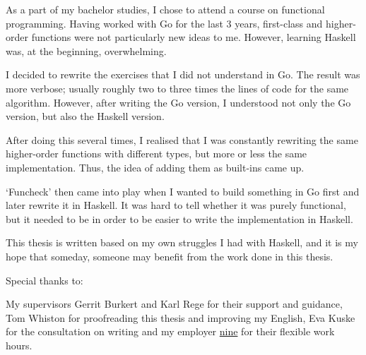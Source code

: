 
As a part of my bachelor studies, I chose to attend a course on functional programming.
Having worked with Go for the last 3 years, first-class and higher-order functions
were not particularly new ideas to me. However, learning Haskell was, at the beginning,
overwhelming.

I decided to rewrite the exercises that I did not understand in Go.
The result was more verbose; usually
roughly two to three times the lines of code for the same algorithm.
However, after writing the Go version, I understood not only the Go version,
but also the Haskell version.

After doing this several times, I realised that I was constantly rewriting
the same higher-order functions with different types, but more or less the same
implementation. Thus, the idea of adding them as built-ins came up.

`Funcheck' then came into play when I wanted to build something in Go first and
later rewrite it in Haskell. It was hard to tell whether it was purely functional,
but it needed to be in order to be easier to write the implementation in Haskell.

This thesis is written based on my own struggles I had with Haskell, and it is
my hope that someday, someone may benefit from the work done in this thesis.

Special thanks to:

My supervisors Gerrit Burkert and Karl Rege for their support and guidance,
Tom Whiston for proofreading this thesis and improving my English,
Eva Kuske for the consultation on writing and
my employer \href{http://nine.ch}{nine} for their flexible work hours.
